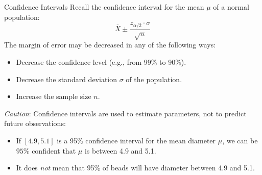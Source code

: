 \documentclass[handout]{beamer}
\begin{document}

\begin{frame}{Confidence Intervals}
Recall the confidence interval for the mean $\mu$ of a normal population:
$$\overline{X}\pm \frac{z_{\alpha/2} \cdot \sigma}{\sqrt n}$$
\pause The margin of error may be decreased in any of the following ways:

\begin{itemize}
\pause\item Decrease the confidence level (e.g., from 99\% to 90\%).
\pause\item Decrease the standard deviation $\sigma$ of the population.
\pause\item Increase the sample size $n$.
\end{itemize}
\pause\textit{Caution}: Confidence intervals are used to estimate parameters, not to predict future observations:
\begin{itemize}
\pause\item If $[4.9,5.1]$ is a 95\% confidence interval for the mean diameter $\mu$, we can be $95\%$ confident that $\mu$ is between 4.9 and 5.1. 
\pause\item It does \textit{not} mean that 95\% of beads will have diameter between 4.9 and 5.1.
\end{itemize}
\end{frame}
\end{document}
